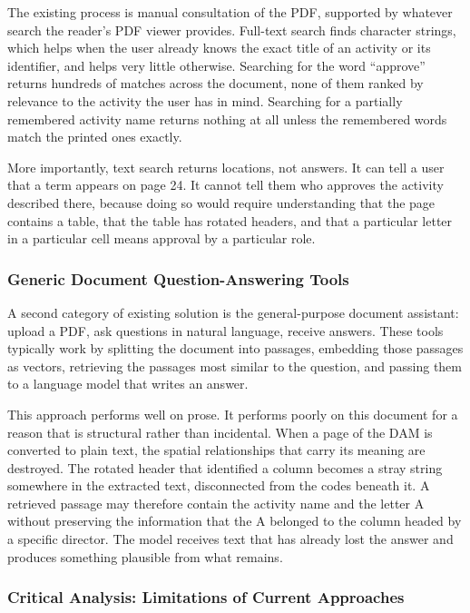 The existing process is manual consultation of the PDF, supported by whatever search the reader's PDF viewer provides. Full-text search finds character strings, which helps when the user already knows the exact title of an activity or its identifier, and helps very little otherwise. Searching for the word ``approve'' returns hundreds of matches across the document, none of them ranked by relevance to the activity the user has in mind. Searching for a partially remembered activity name returns nothing at all unless the remembered words match the printed ones exactly.

More importantly, text search returns locations, not answers. It can tell a user that a term appears on page 24. It cannot tell them who approves the activity described there, because doing so would require understanding that the page contains a table, that the table has rotated headers, and that a particular letter in a particular cell means approval by a particular role.

\subsubsection{Generic Document Question-Answering Tools}

A second category of existing solution is the general-purpose document assistant: upload a PDF, ask questions in natural language, receive answers. These tools typically work by splitting the document into passages, embedding those passages as vectors, retrieving the passages most similar to the question, and passing them to a language model that writes an answer.

This approach performs well on prose. It performs poorly on this document for a reason that is structural rather than incidental. When a page of the DAM is converted to plain text, the spatial relationships that carry its meaning are destroyed. The rotated header that identified a column becomes a stray string somewhere in the extracted text, disconnected from the codes beneath it. A retrieved passage may therefore contain the activity name and the letter A without preserving the information that the A belonged to the column headed by a specific director. The model receives text that has already lost the answer and produces something plausible from what remains.

\subsubsection{Critical Analysis: Limitations of Current Approaches}

